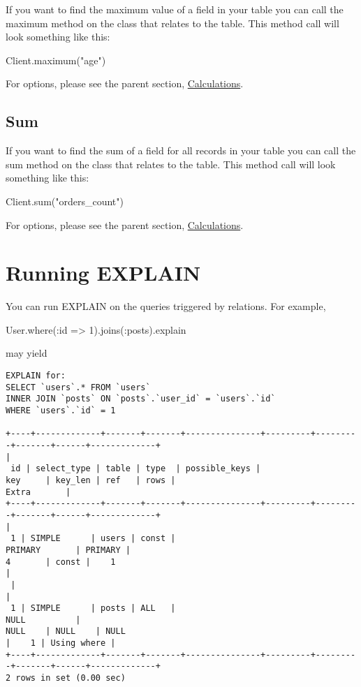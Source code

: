 \documentclass[10pt]{book}
\newenvironment{code}{%
  \scriptsize
    \verbatim
}{%
    \endverbatim
    \newline
}
\begin{document}
If you want to find the maximum value of a field in your table you can call the maximum method on the class that relates to the table. This method call will look something like this:
\begin{code}
Client.maximum("age")
\end{code}

For options, please see the parent section, \hyperlink{calculations}{Calculations}.

\subsection{ Sum}

If you want to find the sum of a field for all records in your table you can call the sum method on the class that relates to the table. This method call will look something like this:
\begin{code}
Client.sum("orders_count")
\end{code}

For options, please see the parent section, \hyperlink{calculations}{Calculations}.

\newpage
\section{ Running EXPLAIN}

You can run EXPLAIN on the queries triggered by relations. For example,
\begin{code}
User.where(:id => 1).joins(:posts).explain
\end{code}

may yield
{\tiny
\begin{verbatim}
EXPLAIN for: 
SELECT `users`.* FROM `users` 
INNER JOIN `posts` ON `posts`.`user_id` = `users`.`id` 
WHERE `users`.`id` = 1

+----+-------------+-------+-------+---------------+---------+---------+-------+------+-------------+
|
 id | select_type | table | type  | possible_keys | 
key     | key_len | ref   | rows | 
Extra       |
+----+-------------+-------+-------+---------------+---------+---------+-------+------+-------------+
| 
 1 | SIMPLE      | users | const | 
PRIMARY       | PRIMARY | 
4       | const |    1 
|            
 |
| 
 1 | SIMPLE      | posts | ALL   | 
NULL          | 
NULL    | NULL    | NULL  
|    1 | Using where |
+----+-------------+-------+-------+---------------+---------+---------+-------+------+-------------+
2 rows in set (0.00 sec)
\end{verbatim}
}
\end{document}
